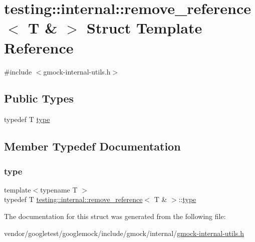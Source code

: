\hypertarget{structtesting_1_1internal_1_1remove__reference_3_01_t_01_6_01_4}{}\section{testing\+:\+:internal\+:\+:remove\+\_\+reference$<$ T \& $>$ Struct Template Reference}
\label{structtesting_1_1internal_1_1remove__reference_3_01_t_01_6_01_4}


{\ttfamily \#include $<$gmock-\/internal-\/utils.\+h$>$}

\subsection*{Public Types}
\begin{DoxyCompactItemize}
\item 
typedef T \hyperlink{structtesting_1_1internal_1_1remove__reference_3_01_t_01_6_01_4_a0d72f004f54016a47c752a82be352a19}{type}
\end{DoxyCompactItemize}


\subsection{Member Typedef Documentation}
\mbox{\label{structtesting_1_1internal_1_1remove__reference_3_01_t_01_6_01_4_a0d72f004f54016a47c752a82be352a19}} 
\subsubsection{\texorpdfstring{type}{type}}
{\footnotesize\ttfamily template$<$typename T $>$ \\
typedef T \hyperlink{structtesting_1_1internal_1_1remove__reference}{testing\+::internal\+::remove\+\_\+reference}$<$ T \& $>$\+::\hyperlink{structtesting_1_1internal_1_1remove__reference_3_01_t_01_6_01_4_a0d72f004f54016a47c752a82be352a19}{type}}



The documentation for this struct was generated from the following file\+:\begin{DoxyCompactItemize}
\item 
vendor/googletest/googlemock/include/gmock/internal/\hyperlink{gmock-internal-utils_8h}{gmock-\/internal-\/utils.\+h}\end{DoxyCompactItemize}

